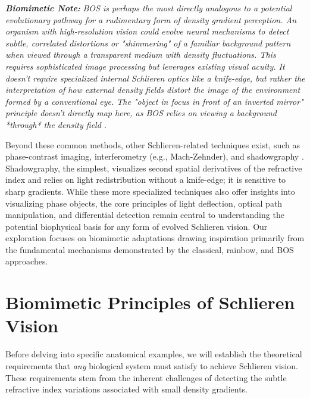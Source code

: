 \documentclass[11pt]{article}
\begin{document}
     \textbf{\textit{Biomimetic Note:}}\textit{ BOS is perhaps the most directly analogous to a potential evolutionary pathway for a rudimentary form of density gradient perception. An organism with high-resolution vision could evolve neural mechanisms to detect subtle, correlated distortions or "shimmering" of a familiar background pattern when viewed through a transparent medium with density fluctuations. This requires sophisticated image processing but leverages existing visual acuity. It doesn't require specialized internal Schlieren optics like a knife-edge, but rather the interpretation of how external density fields distort the image of the environment formed by a conventional eye. The "object in focus in front of an inverted mirror" principle doesn't directly map here, as BOS relies on viewing a background *through* the density field \cite{Settles2017Review}.}

Beyond these common methods, other Schlieren-related techniques exist, such as phase-contrast imaging, interferometry (e.g., Mach-Zehnder), and shadowgraphy \cite{Settles2001Schlieren}. Shadowgraphy, the simplest, visualizes second spatial derivatives of the refractive index and relies on light redistribution without a knife-edge; it is sensitive to sharp gradients. While these more specialized techniques also offer insights into visualizing phase objects, the core principles of light deflection, optical path manipulation, and differential detection remain central to understanding the potential biophysical basis for any form of evolved Schlieren vision. Our exploration focuses on biomimetic adaptations drawing inspiration primarily from the fundamental mechanisms demonstrated by the classical, rainbow, and BOS approaches.

\section{Biomimetic Principles of Schlieren Vision}

Before delving into specific anatomical examples, we will establish the theoretical requirements that \textit{any} biological system must satisfy to achieve Schlieren vision. These requirements stem from the inherent challenges of detecting the subtle refractive index variations associated with small density gradients.
\end{document}

